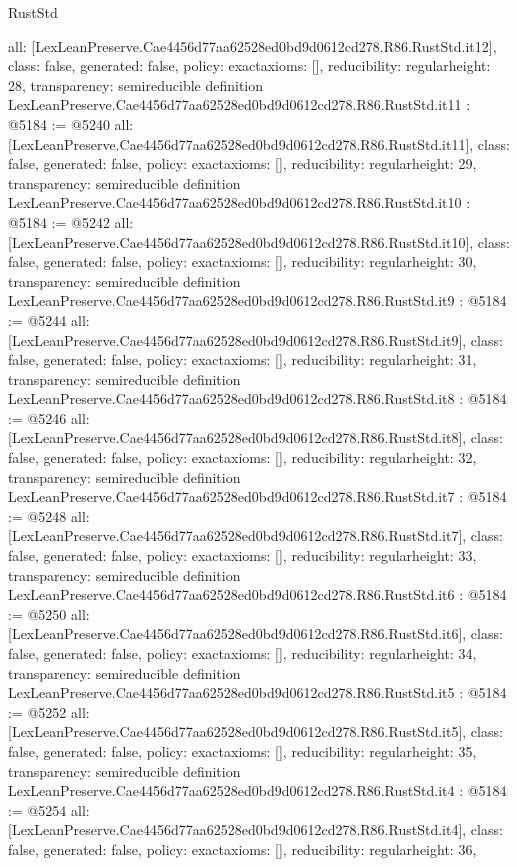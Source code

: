\begin{lexlean}{RustStd}
\begin{coremodule}
{  all: [LexLeanPreserve.Cae4456d77aa62528ed0bd9d0612cd278.R86.RustStd.it12],
  class: false,
  generated: false,
  policy: exact{axioms: []},
  reducibility: regular{height: 28},
  transparency: semireducible
}
definition LexLeanPreserve.Cae4456d77aa62528ed0bd9d0612cd278.R86.RustStd.it11 : @5184 := @5240 {
  all: [LexLeanPreserve.Cae4456d77aa62528ed0bd9d0612cd278.R86.RustStd.it11],
  class: false,
  generated: false,
  policy: exact{axioms: []},
  reducibility: regular{height: 29},
  transparency: semireducible
}
definition LexLeanPreserve.Cae4456d77aa62528ed0bd9d0612cd278.R86.RustStd.it10 : @5184 := @5242 {
  all: [LexLeanPreserve.Cae4456d77aa62528ed0bd9d0612cd278.R86.RustStd.it10],
  class: false,
  generated: false,
  policy: exact{axioms: []},
  reducibility: regular{height: 30},
  transparency: semireducible
}
definition LexLeanPreserve.Cae4456d77aa62528ed0bd9d0612cd278.R86.RustStd.it9 : @5184 := @5244 {
  all: [LexLeanPreserve.Cae4456d77aa62528ed0bd9d0612cd278.R86.RustStd.it9],
  class: false,
  generated: false,
  policy: exact{axioms: []},
  reducibility: regular{height: 31},
  transparency: semireducible
}
definition LexLeanPreserve.Cae4456d77aa62528ed0bd9d0612cd278.R86.RustStd.it8 : @5184 := @5246 {
  all: [LexLeanPreserve.Cae4456d77aa62528ed0bd9d0612cd278.R86.RustStd.it8],
  class: false,
  generated: false,
  policy: exact{axioms: []},
  reducibility: regular{height: 32},
  transparency: semireducible
}
definition LexLeanPreserve.Cae4456d77aa62528ed0bd9d0612cd278.R86.RustStd.it7 : @5184 := @5248 {
  all: [LexLeanPreserve.Cae4456d77aa62528ed0bd9d0612cd278.R86.RustStd.it7],
  class: false,
  generated: false,
  policy: exact{axioms: []},
  reducibility: regular{height: 33},
  transparency: semireducible
}
definition LexLeanPreserve.Cae4456d77aa62528ed0bd9d0612cd278.R86.RustStd.it6 : @5184 := @5250 {
  all: [LexLeanPreserve.Cae4456d77aa62528ed0bd9d0612cd278.R86.RustStd.it6],
  class: false,
  generated: false,
  policy: exact{axioms: []},
  reducibility: regular{height: 34},
  transparency: semireducible
}
definition LexLeanPreserve.Cae4456d77aa62528ed0bd9d0612cd278.R86.RustStd.it5 : @5184 := @5252 {
  all: [LexLeanPreserve.Cae4456d77aa62528ed0bd9d0612cd278.R86.RustStd.it5],
  class: false,
  generated: false,
  policy: exact{axioms: []},
  reducibility: regular{height: 35},
  transparency: semireducible
}
definition LexLeanPreserve.Cae4456d77aa62528ed0bd9d0612cd278.R86.RustStd.it4 : @5184 := @5254 {
  all: [LexLeanPreserve.Cae4456d77aa62528ed0bd9d0612cd278.R86.RustStd.it4],
  class: false,
  generated: false,
  policy: exact{axioms: []},
  reducibility: regular{height: 36},
}
\end{coremodule}
\end{lexlean}
